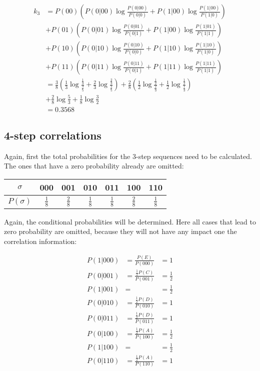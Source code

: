 \documentclass[12pt]{scrartcl}
\begin{document}
\begin{equation}\begin{aligned}
k_3 
&= P(00) \left( P(0|00) \log \frac{P(0|00)}{P(0|0)} + P(1|00) \log \frac{P(1|00)}{P(1|0)} \right)\\
&+ P(01) \left( P(0|01) \log \frac{P(0|01)}{P(0|1)} + P(1|00) \log \frac{P(1|01)}{P(1|1)} \right)\\
&+ P(10) \left( P(0|10) \log \frac{P(0|10)}{P(0|0)} + P(1|10) \log \frac{P(1|10)}{P(1|0)} \right)\\
&+ P(11) \left( P(0|11) \log \frac{P(0|11)}{P(0|1)} + P(1|11) \log \frac{P(1|11)}{P(1|1)} \right)\\
&= \frac{3}{8} \left( 
	\frac{1}{3} \log \frac{\frac{1}{3}}{\frac{3}{5}} +
	\frac{2}{3} \log \frac{\frac{2}{3}}{\frac{2}{5}}
\right) + \frac{2}{8} \left( 
	\frac{1}{2} \log \frac{\frac{1}{2}}{\frac{2}{3}} +
	\frac{1}{2} \log \frac{\frac{1}{2}}{\frac{1}{3}}
\right)\\
&+ \frac{2}{8} \log \frac{5}{3} + \frac{1}{8} \log \frac{3}{2}\\
&= 0.3568
\end{aligned}\end{equation}

\subsection{4-step correlations}

Again, first the total probabilities for the 3-step sequences need to be calculated. The ones that have a zero probability already are omitted:

\begin{table}[!h]
\centering
\begin{tabular}{c||c|c|c|c|c|c}
$\sigma$ & 000 & 001 & 010 & 011 & 100 & 110 \\ \hline
$P(\sigma)$ & $\frac{1}{8}$ & $\frac{2}{8}$ & $\frac{1}{8}$ & $\frac{1}{8}$ & $\frac{2}{8}$ & $\frac{1}{8}$
\end{tabular}
\end{table}

Again, the conditional probabilities will be determined. Here all cases that lead to zero probability are omitted, because they will not have any impact one the correlation information:

\begin{equation}\begin{aligned}
P(1|000) &= \frac{P(E)}{P(000)} &= 1\\
P(0|001) &= \frac{\frac{1}{2}P(C)}{P(001)} &= \frac{1}{2}\\
P(1|001) &= &= \frac{1}{2}\\
P(0|010) &= \frac{\frac{1}{2}P(D)}{P(010)} &= 1\\
P(0|011) &= \frac{\frac{1}{2}P(D)}{P(011)} &= 1\\
P(0|100) &= \frac{\frac{1}{2}P(A)}{P(100)} &= \frac{1}{2}\\
P(1|100) &= &= \frac{1}{2}\\
P(0|110) &= \frac{\frac{1}{2}P(A)}{P(110)} &= 1
\end{aligned}\end{equation}
\end{document}
